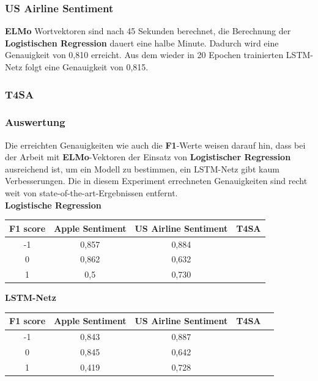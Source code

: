 \subsubsection*{US Airline Sentiment}
\textbf{ELMo} Wortvektoren sind nach 45 Sekunden berechnet, die Berechnung der \textbf{Logistischen Regression} dauert eine halbe Minute. Dadurch wird eine Genauigkeit von 0,810 erreicht.  Aus dem wieder in 20 Epochen trainierten LSTM-Netz folgt eine Genauigkeit von 0,815.

\subsubsection*{T4SA}

\subsubsection*{Auswertung}
Die erreichten Genauigkeiten wie auch die \textbf{F1}-Werte weisen darauf hin, dass bei der Arbeit mit \textbf{ELMo}-Vektoren der Einsatz von \textbf{Logistischer Regression} ausreichend ist, um ein Modell zu bestimmen, ein LSTM-Netz gibt kaum Verbesserungen. Die in diesem Experiment errechneten Genauigkeiten sind recht weit von state-of-the-art-Ergebnissen entfernt.\\
\textbf{Logistische Regression}
\begin{center}
\begin{tabular}{|c||c|c|c|}
\hline
F1 score & Apple Sentiment & US Airline Sentiment & T4SA\\ 
\hline\hline
-1 & 0,857 & 0,884 & \\
\hline
0 & 0,862 & 0,632 & \\ 
\hline
1 & 0,5 & 0,730 & \\
\hline    
\end{tabular}
\end{center}

\textbf{LSTM-Netz}
\begin{center}
\begin{tabular}{|c||c|c|c|c|}
\hline
F1 score & Apple Sentiment & US Airline Sentiment & T4SA\\ 
\hline\hline
-1 & 0,843 & 0,887 & \\
\hline
0 & 0,845 & 0,642 & \\ 
\hline
1 & 0,419 & 0,728 & \\
\hline    
\end{tabular}
\end{center}


